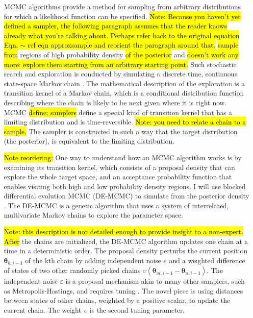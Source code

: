 \documentclass[12pt]{article}
\newcommand{\trish}[1]{\textrm{\hl{#1}}}
\begin{document}
MCMC algorithms provide a method for sampling from arbitrary distributions
for which a likelihood function can be specified.
\trish{Note: Because you haven't yet defined a sampler, the following
paragraph assumes that the reader knows already what you're talking
about.  Perhaps refer back to the original equation
Eqn. $\sim$ ref eqn approxsample and reorient the paragraph around that.}
\trish{sample from} regions of high probability density \trish{of the
posterior} and \trish{doesn't work any more: explore them starting
from an arbitrary starting point.} Such stochastic search and
exploration is conducted by simulating a discrete time, continuous
state-space Markov chain \citep{KarTay1975,KarTay1981,Ros2014}. The
mathematical description of the exploration is a transition kernel of
a Markov chain, which is a conditional distribution function
describing where the chain is likely to be next given where it is
right now. MCMC \trish{define: samplers} define a special kind of
transition kernel that has a limiting distribution and is
time-reversible. \trish{Note: you need to relate a chain to a sample.}
The sampler is constructed in such a way that the target distribution
(the posterior), is equivalent to the limiting
distribution.
    
\trish{Note reordering:} One way to understand how an MCMC algorithm
works is by examining its transition kernel, which consists of a
proposal density that can explore the whole target space, and an
acceptance probability function that enables visiting both high and
low probability density regions.  I will use blocked differential
evolution MCMC (DE-MCMC) to simulate from the posterior density
\citep{Ter2006,TurSed2013}. The DE-MCMC is a genetic algorithm that
uses a system of interrelated, multivariate Markov chains to explore
the parameter space.
    
\trish{Note: this description is not detailed enough to provide
insight to a non-expert.}  \trish{After} the chains are initialized,
the DE-MCMC algorithm updates one chain at a time in a deterministic
order. The proposal density perturbs the current position
$\boldsymbol{\theta}_{k, i - 1}$ of the kth chain by adding
independent noise $\varepsilon$ and a weighted difference of states of
two other randomly picked chains $\upsilon(\boldsymbol{\theta}_{m, i -
1} - \boldsymbol{\theta}_{n, i - 1})$. The independent noise
$\varepsilon$ is a proposal mechanism akin to many other samplers,
such as Metropolis-Hastings, and requires tuning
\citep{ChiGre1995,RobCas2004,GamLop2006}. The novel piece is using distances
between states of other chains, weighted by a positive scalar, to
update the current chain. The weight $\upsilon$ is the second tuning
parameter.
    
\end{document}
